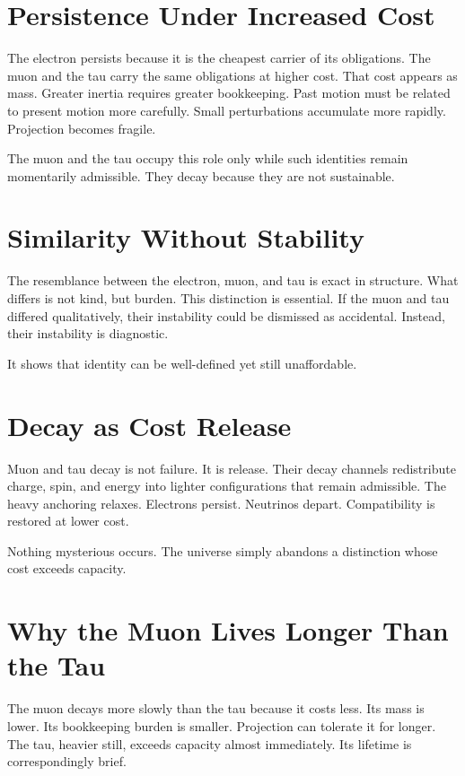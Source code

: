 \documentclass[11pt,twoside,openright]{book}
\begin{document}
\section*{Persistence Under Increased Cost}

The electron persists because it is the cheapest carrier of its obligations. The muon and the tau carry the same obligations at higher cost. That cost appears as mass. Greater inertia requires greater bookkeeping. Past motion must be related to present motion more carefully. Small perturbations accumulate more rapidly. Projection becomes fragile.

The muon and the tau occupy this role only while such identities remain momentarily admissible. They decay because they are not sustainable.

\section*{Similarity Without Stability}

The resemblance between the electron, muon, and tau is exact in structure. What differs is not kind, but burden. This distinction is essential. If the muon and tau differed qualitatively, their instability could be dismissed as accidental. Instead, their instability is diagnostic.

It shows that identity can be well-defined yet still unaffordable.

\section*{Decay as Cost Release}

Muon and tau decay is not failure. It is release. Their decay channels redistribute charge, spin, and energy into lighter configurations that remain admissible. The heavy anchoring relaxes. Electrons persist. Neutrinos depart. Compatibility is restored at lower cost.

Nothing mysterious occurs. The universe simply abandons a distinction whose cost exceeds capacity.

\section*{Why the Muon Lives Longer Than the Tau}

The muon decays more slowly than the tau because it costs less. Its mass is lower. Its bookkeeping burden is smaller. Projection can tolerate it for longer. The tau, heavier still, exceeds capacity almost immediately. Its lifetime is correspondingly brief.
\end{document}
